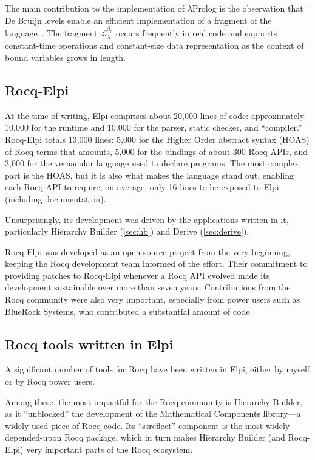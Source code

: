 \documentclass[a4paper, 11pt]{book}
\begin{document}
The main contribution to the implementation of $\lambda$Prolog is the observation that De Bruijn levels enable an efficient implementation of a fragment of the language~\cite{dunchev15lpar}. The fragment $\mathcal{L}_\lambda^{\beta_0}$ occurs frequently in real code and supports constant-time operations and constant-size data representation as the context of bound variables grows in length.

\subsection{Rocq-Elpi}


At the time of writing, Elpi comprises about 20,000 lines of code: approximately 10,000 for the runtime and 10,000 for the parser, static checker, and ``compiler.'' Rocq-Elpi totals 13,000 lines: 5,000 for the Higher Order abstract syntax (HOAS) of Rocq terms that amounts, 5,000 for the bindings of about 300 Rocq APIs, and 3,000 for the vernacular language used to declare programs. The most complex part is the HOAS, but it is also what makes the language stand out, enabling each Rocq API to require, on average, only 16 lines to be exposed to Elpi (including documentation).

Unsurprisingly, its development was driven by the applications written in it, particularly Hierarchy Builder (\cref{sec:hb}) and Derive (\cref{sec:derive}).

Rocq-Elpi was developed as an open source project from the very beginning, keeping the Rocq development team informed of the effort. Their commitment to providing patches to Rocq-Elpi whenever a Rocq API evolved made its development sustainable over more than seven years. Contributions from the Rocq community were also very important, especially from power users such as BlueRock Systems, who contributed a substantial amount of code.

\subsection{Rocq tools written in Elpi}

A significant number of tools for Rocq have been written in Elpi, either by myself or by Rocq power users.

Among these, the most impactful for the Rocq community is Hierarchy Builder, as it ``unblocked'' the development of the Mathematical Components library—a widely used piece of Rocq code. Its ``ssreflect'' component is the most widely depended-upon Rocq package, which in turn makes Hierarchy Builder (and Rocq-Elpi) very important parts of the Rocq ecosystem.
\end{document}
